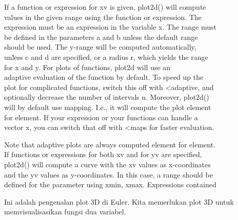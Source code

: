 \documentclass[a4paper,10pt]{article}
\begin{document}
\begin{eulernotebook}
\begin{eulercomment}
If a function or expression for xv is given, plot2d() will compute\\
values in the given range using the function or expression. The\\
expression must be an expression in the variable x. The range must\\
be defined in the parameters a and b unless the default range\\
[-2,2] should be used. The y-range will be computed automatically,\\
unless c and d are specified, or a radius r, which yields the range\\
[-r,r] for x and y. For plots of functions, plot2d will use an\\
adaptive evaluation of the function by default. To speed up the\\
plot for complicated functions, switch this off with \textless{}adaptive, and\\
optionally decrease the number of intervals n. Moreover, plot2d()\\
will by default use mapping. I.e., it will compute the plot element\\
for element. If your expression or your functions can handle a\\
vector x, you can switch that off with \textless{}maps for faster evaluation.

Note that adaptive plots are always computed element for element.\\
If functions or expressions for both xv and for yv are specified,\\
plot2d() will compute a curve with the xv values as x-coordinates\\
and the yv values as y-coordinates. In this case, a range should be\\
defined for the parameter using xmin, xmax. Expressions contained





\end{eulercomment}
\eulersubheading{}
\eulersubheading{}
\eulersubheading{}
\begin{eulercomment}



\end{eulercomment}
\begin{eulercomment}
Ini adalah pengenalan plot 3D di Euler. Kita memerlukan plot 3D untuk
memvisualisasikan fungsi dua variabel.


\end{eulercomment}
\end{eulernotebook}
\end{document}

